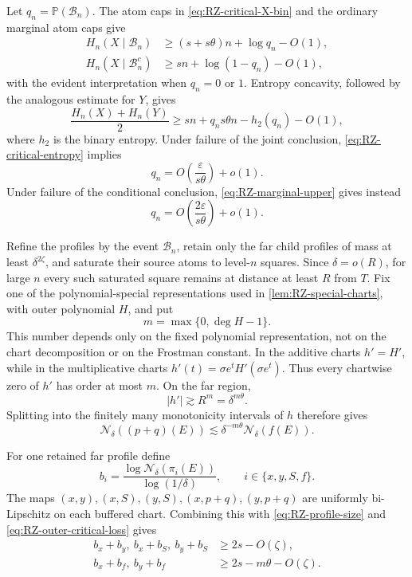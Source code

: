 \documentclass[11pt]{article}
\begin{document}
Let \(q_n=\mathbb P(\mathcal B_n)\).  The atom caps in
\eqref{eq:RZ-critical-X-bin} and the ordinary marginal atom caps give
\begin{align*}
 H_n(X\mid\mathcal B_n)&\ge(s+s\theta)n+\log q_n-O(1),\\
 H_n(X\mid\mathcal B_n^c)&\ge sn+\log(1-q_n)-O(1),
\end{align*}
with the evident interpretation when \(q_n=0\) or \(1\).  Entropy
concavity, followed by the analogous estimate for \(Y\), gives
\begin{equation}
 \frac{H_n(X)+H_n(Y)}{2}
 \ge sn+q_ns\theta n-h_2(q_n)-O(1),
 \label{eq:RZ-critical-entropy}
\end{equation}
where \(h_2\) is the binary entropy.  Under failure of the joint
conclusion, \eqref{eq:RZ-critical-entropy} implies
\begin{equation}
 q_n=O\!\left(\frac{\varepsilon}{s\theta}\right)+o(1).
 \label{eq:RZ-critical-mass-joint}
\end{equation}
Under failure of the conditional conclusion,
\eqref{eq:RZ-marginal-upper} gives instead
\begin{equation}
 q_n=O\!\left(\frac{2\varepsilon}{s\theta}\right)+o(1).
 \label{eq:RZ-critical-mass-conditional}
\end{equation}

Refine the profiles by the event \(\mathcal B_n\), retain only the
far child profiles of mass at least \(\delta^{2\zeta}\), and saturate
their source atoms to level-\(n\) squares.  Since \(\delta=o(R)\), for
large \(n\) every such saturated square remains at distance at least
\(R\) from \(T\).  Fix one of the polynomial-special representations
used in \cref{lem:RZ-special-charts}, with outer polynomial \(H\), and
put
\[
 m=\max\{0,\deg H-1\}.
\]
This number depends only on the fixed polynomial representation, not
on the chart decomposition or on the Frostman constant.  In the
additive charts \(h'=H'\), while in the multiplicative charts
\(h'(t)=\sigma e^tH'(\sigma e^t)\).  Thus every chartwise zero of
\(h'\) has order at most \(m\).  On the far region,
\[
 |h'|\gtrsim R^m=\delta^{m\theta}.
\]
Splitting into the finitely many monotonicity intervals of \(h\)
therefore gives
\begin{equation}
 \mathcal N_\delta((p+q)(E))
 \lesssim\delta^{-m\theta}\mathcal N_\delta(f(E)).
 \label{eq:RZ-outer-critical-loss}
\end{equation}

For one retained far profile define
\begin{equation}
 b_i=\frac{\log \mathcal N_\delta(\pi_i(E))}{\log(1/\delta)},
 \qquad i\in\{x,y,S,f\}.
 \label{eq:RZ-covering-exponents}
\end{equation}
The maps \((x,y),(x,S),(y,S),(x,p+q),(y,p+q)\) are uniformly
bi-Lipschitz on each buffered chart.  Combining this with
\eqref{eq:RZ-profile-size} and
\eqref{eq:RZ-outer-critical-loss} gives
\begin{align}
 b_x+b_y,\ b_x+b_S,\ b_y+b_S
 &\ge2s-O(\zeta),
 \label{eq:RZ-pair-bounds-1}\\
 b_x+b_f,\ b_y+b_f
 &\ge2s-m\theta-O(\zeta).
 \label{eq:RZ-pair-bounds-2}
\end{align}
\end{document}
